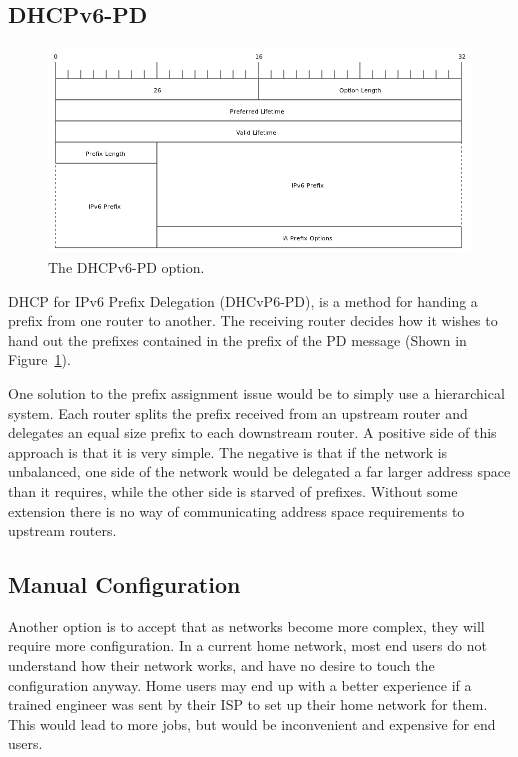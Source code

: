 \documentclass[12pt,a4paper,twoside]{report}
\begin{document}
\subsection{DHCPv6-PD}
\begin{figure}
\begin{center}
	\includegraphics[width=\linewidth]{../Diagrams/Packets/pd-option.png}
	\caption{The DHCPv6-PD option.}\label{fig:pd-option}
\end{center}
\end{figure}

DHCP for IPv6 Prefix Delegation (DHCvP6-PD), is a method for handing a prefix from one router to
another. The receiving router decides how it wishes to hand out the prefixes
contained in the prefix of the PD message (Shown in Figure~\ref{fig:pd-option}). 

One solution to the prefix assignment issue would be to simply use a
hierarchical system. Each router splits the prefix received from an upstream
router and delegates an equal size prefix to each downstream router. A positive
side of this approach is that it is very simple. The negative is that if the
network is unbalanced, one side of the network would be delegated a far larger
address space than it requires, while the other side is starved of prefixes.
Without some extension there is no way of communicating address space
requirements to upstream routers.   

\subsection{Manual Configuration}
Another option is to accept that as networks become more complex, they will
require more configuration. In a current home network, most end users do not
understand how their network works, and have no desire to touch the
configuration anyway. Home users may end up with a better experience if a
trained engineer was sent by their ISP to set up their home network for them.
This would lead to more jobs, but would be inconvenient and expensive for end
users.
\end{document}
